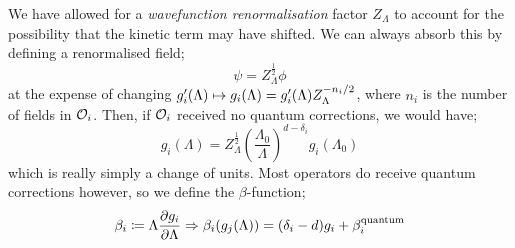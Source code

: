 We have allowed for a \emph{wavefunction renormalisation} factor $Z_{\Lambda}$ to account for the possibility that the kinetic term may have shifted. We can always absorb this by defining a renormalised field;
\begin{equation*}
\psi = Z_{\Lambda}^{\tfrac{1}{2}}\phi
\end{equation*}
at the expense of changing $g_i^{\prime}(\Lambda) \mapsto g_i(\Lambda) = g_i^{\prime}(\Lambda)Z_{\Lambda}^{-n_i/2}$, where $n_i$ is the number of fields in $\mathcal{O}_i$. Then, if $\mathcal{O}_i$ received no quantum corrections, we would have;
\begin{equation*}
g_{i}(\Lambda) = Z_{\Lambda}^{\tfrac{1}{2}}\left(\frac{\Lambda_0}{\Lambda}\right)^{d - \delta_i}g_i(\Lambda_0)
\end{equation*}
which is really simply a change of units. Most operators do receive quantum corrections however, so we define the $\beta$-function;
\begin{equation}
\beta_i \coloneqq \Lambda \frac{\del g_i}{\del \Lambda} \Rightarrow \beta_i\left(g_j(\Lambda)\right) = (\delta_i - d)g_i + \beta_i^{\text{quantum}}
\end{equation}
